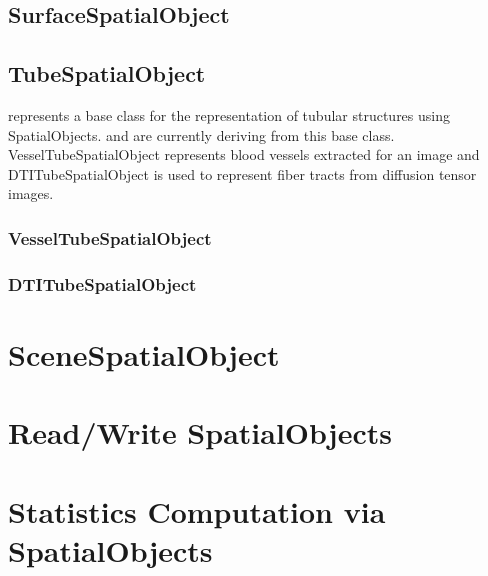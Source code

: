 \subsection{SurfaceSpatialObject}
\label{sec:SurfaceSpatialObject}
\ifitkFullVersion 

\fi

\subsection{TubeSpatialObject}

 represents a base class for the representation
of tubular structures using SpatialObjects.  and 
 are currently deriving from this base class.
VesselTubeSpatialObject represents blood vessels extracted for an image and 
DTITubeSpatialObject is used to represent fiber tracts from diffusion tensor images.

\label{sec:TubeSpatialObject}
\ifitkFullVersion 

\fi

\subsubsection{VesselTubeSpatialObject}
\label{sec:VesselTubeSpatialObject}
\ifitkFullVersion 

\fi

\subsubsection{DTITubeSpatialObject}
\label{sec:DTITubeSpatialObject}
\ifitkFullVersion 

\fi

\section{SceneSpatialObject}
\label{sec:Scene}
\ifitkFullVersion 

\fi

\section{Read/Write SpatialObjects}
\label{sec:ReadWriteSpatialObjects}
\ifitkFullVersion 

\fi

\section{Statistics Computation via SpatialObjects}
\label{sec:SpatialObjectToImageStatisticsCalculator}
\ifitkFullVersion 

\fi
